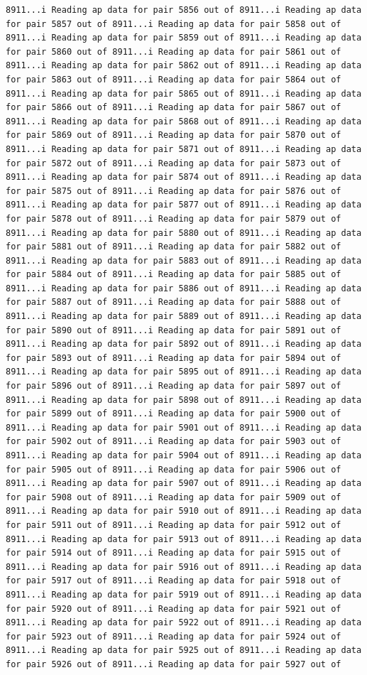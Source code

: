 \documentclass[
]{article}
\begin{document}
\begin{verbatim}
8911...i Reading ap data for pair 5856 out of 8911...i Reading ap data for pair 5857 out of 8911...i Reading ap data for pair 5858 out of 8911...i Reading ap data for pair 5859 out of 8911...i Reading ap data for pair 5860 out of 8911...i Reading ap data for pair 5861 out of 8911...i Reading ap data for pair 5862 out of 8911...i Reading ap data for pair 5863 out of 8911...i Reading ap data for pair 5864 out of 8911...i Reading ap data for pair 5865 out of 8911...i Reading ap data for pair 5866 out of 8911...i Reading ap data for pair 5867 out of 8911...i Reading ap data for pair 5868 out of 8911...i Reading ap data for pair 5869 out of 8911...i Reading ap data for pair 5870 out of 8911...i Reading ap data for pair 5871 out of 8911...i Reading ap data for pair 5872 out of 8911...i Reading ap data for pair 5873 out of 8911...i Reading ap data for pair 5874 out of 8911...i Reading ap data for pair 5875 out of 8911...i Reading ap data for pair 5876 out of 8911...i Reading ap data for pair 5877 out of 8911...i Reading ap data for pair 5878 out of 8911...i Reading ap data for pair 5879 out of 8911...i Reading ap data for pair 5880 out of 8911...i Reading ap data for pair 5881 out of 8911...i Reading ap data for pair 5882 out of 8911...i Reading ap data for pair 5883 out of 8911...i Reading ap data for pair 5884 out of 8911...i Reading ap data for pair 5885 out of 8911...i Reading ap data for pair 5886 out of 8911...i Reading ap data for pair 5887 out of 8911...i Reading ap data for pair 5888 out of 8911...i Reading ap data for pair 5889 out of 8911...i Reading ap data for pair 5890 out of 8911...i Reading ap data for pair 5891 out of 8911...i Reading ap data for pair 5892 out of 8911...i Reading ap data for pair 5893 out of 8911...i Reading ap data for pair 5894 out of 8911...i Reading ap data for pair 5895 out of 8911...i Reading ap data for pair 5896 out of 8911...i Reading ap data for pair 5897 out of 8911...i Reading ap data for pair 5898 out of 8911...i Reading ap data for pair 5899 out of 8911...i Reading ap data for pair 5900 out of 8911...i Reading ap data for pair 5901 out of 8911...i Reading ap data for pair 5902 out of 8911...i Reading ap data for pair 5903 out of 8911...i Reading ap data for pair 5904 out of 8911...i Reading ap data for pair 5905 out of 8911...i Reading ap data for pair 5906 out of 8911...i Reading ap data for pair 5907 out of 8911...i Reading ap data for pair 5908 out of 8911...i Reading ap data for pair 5909 out of 8911...i Reading ap data for pair 5910 out of 8911...i Reading ap data for pair 5911 out of 8911...i Reading ap data for pair 5912 out of 8911...i Reading ap data for pair 5913 out of 8911...i Reading ap data for pair 5914 out of 8911...i Reading ap data for pair 5915 out of 8911...i Reading ap data for pair 5916 out of 8911...i Reading ap data for pair 5917 out of 8911...i Reading ap data for pair 5918 out of 8911...i Reading ap data for pair 5919 out of 8911...i Reading ap data for pair 5920 out of 8911...i Reading ap data for pair 5921 out of 8911...i Reading ap data for pair 5922 out of 8911...i Reading ap data for pair 5923 out of 8911...i Reading ap data for pair 5924 out of 8911...i Reading ap data for pair 5925 out of 8911...i Reading ap data for pair 5926 out of 8911...i Reading ap data for pair 5927 out of 
\end{verbatim}
\end{document}
